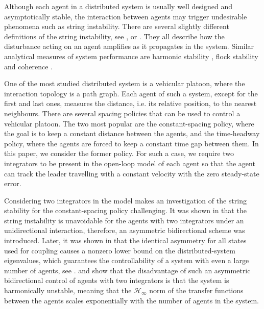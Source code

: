 \documentclass[10pt,twocolumn,twoside]{IEEEtran}
\theoremstyle{definition}
\begin{document}
Although each agent in a distributed system is usually well designed and asymptotically stable, the interaction between agents may trigger undesirable phenomena such as string instability. There are several slightly different definitions of the string instability, see \cite{Eyre1998a}, \cite{Ploeg2014} or \cite{Swaroop1996}. They all describe how the disturbance acting on an agent amplifies as it propagates in the system. Similar analytical measures of system performance are harmonic stability \cite{Tangerman2012}, flock stability \cite{Cantos2013} and coherence \cite{Bamieh2012b}.

One of the most studied distributed system is a vehicular platoon, where the interaction topology is a path graph. Each agent of such a system, except for the first and last ones, measures the distance, i.e. its relative position, to the nearest neighbours. There are several spacing policies that can be used to control a vehicular platoon. The two most popular are the constant-spacing policy, where the goal is to keep a constant distance between the agents, and the time-headway policy, where the agents are forced to keep a constant time gap between them. In this paper, we consider the former policy. For such a case, we require two integrators to be present in the open-loop model of each agent so that the agent can track the leader travelling with a constant velocity with the zero steady-state error.

Considering two integrators in the model makes an investigation of the string stability for the constant-spacing policy challenging. It was shown in \cite{Seiler2004a} that the string instability is unavoidable for the agents with two integrators under an unidirectional interaction, therefore, an asymmetric bidirectional scheme was introduced. Later, it was shown in \cite{Hao2011} that the identical asymmetry for all states used for coupling causes a nonzero lower bound on the distributed-system eigenvalues, which guarantees the controllability of a system with even a large number of agents, see \cite{Barooah2009}. \cite{Tangerman2012} and \cite{Herman2014c} show that the disadvantage of such an asymmetric bidirectional control of agents with two integrators is that the system is harmonically unstable, meaning that the $\mathcal{H}_{\infty}$ norm of the transfer functions between the agents scales exponentially with the number of agents in the system.
\end{document}
